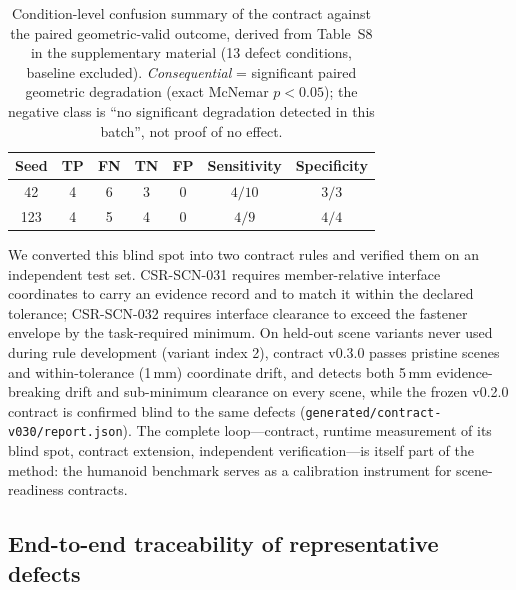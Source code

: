 \begin{table}[H]
\centering
\caption{Condition-level confusion summary of the contract against the
paired geometric-valid outcome, derived from Table~S8 in the supplementary
material (13 defect conditions, baseline excluded).
\emph{Consequential} = significant paired geometric degradation (exact
McNemar $p<0.05$); the negative class is ``no significant degradation
detected in this batch'', not proof of no effect.}
\label{tab:readiness-confusion}
\small
\begin{tabular}{ccccccc}
\toprule
Seed & TP & FN & TN & FP & Sensitivity & Specificity \\
\midrule
42 & 4 & 6 & 3 & 0 & $4/10$ & $3/3$ \\
123 & 4 & 5 & 4 & 0 & $4/9$ & $4/4$ \\
\bottomrule
\end{tabular}
\end{table}

We converted this blind spot into two contract rules and verified them on an
independent test set. CSR-SCN-031 requires member-relative interface
coordinates to carry an evidence record and to match it within the declared
tolerance; CSR-SCN-032 requires interface clearance to exceed the fastener
envelope by the task-required minimum. On held-out scene variants never used
during rule development (variant index 2), contract v0.3.0 passes pristine
scenes and within-tolerance (1\,mm) coordinate drift, and detects both
5\,mm evidence-breaking drift and sub-minimum clearance on every scene, while
the frozen v0.2.0 contract is confirmed blind to the same defects
(\texttt{generated/contract-v030/report.json}). The complete
loop---contract, runtime measurement of its blind spot, contract extension,
independent verification---is itself part of the method: the humanoid
benchmark serves as a calibration instrument for scene-readiness contracts.

\subsection{End-to-end traceability of representative defects}
\label{sec:traceability}

